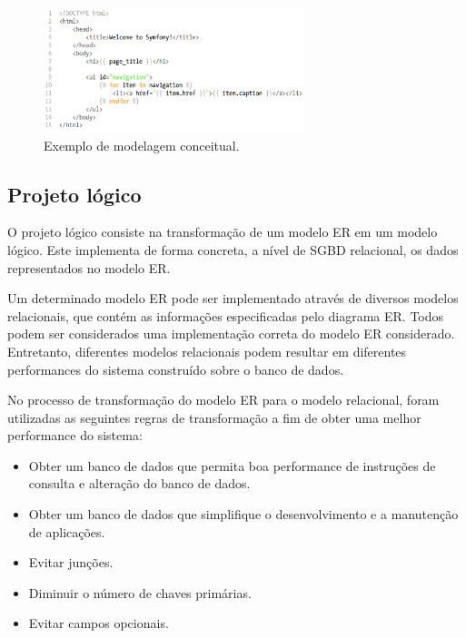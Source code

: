\documentclass[cic,tc]{iiufrgs}
\begin{document}
\begin{figure}[h]
    \caption{Exemplo de modelagem conceitual.}
       	\begin{center}
            \includegraphics[width=0.68\textwidth]{figuras/twig-symf.png}
        \end{center}
    \label{modelagemBDExemplol}
\end{figure}

\subsection{Projeto lógico}
\label{BDProjeto}

O projeto lógico consiste na transformação de um modelo ER em um modelo lógico. Este implementa de forma concreta, a nível de SGBD relacional, os dados representados no modelo ER.

Um determinado modelo ER pode ser implementado através de diversos modelos relacionais, que contém as informações especificadas pelo diagrama ER. Todos podem ser considerados uma implementação correta do modelo ER considerado. Entretanto, diferentes modelos relacionais podem resultar em diferentes performances do sistema construído sobre o banco de dados. 

No processo de transformação do modelo ER para o modelo relacional, foram utilizadas as seguintes regras de transformação \cite{heuser} a fim de obter uma melhor performance do sistema: 

\begin{itemize}
    \item Obter um banco de dados que permita boa performance de instruções de consulta e alteração do banco de dados.
    
    \item Obter um banco de dados que simplifique o desenvolvimento e a manutenção de aplicações.
    
    \item Evitar junções.
    
    \item Diminuir o número de chaves primárias.
    
    \item Evitar campos opcionais.
    
\end{itemize}
\end{document}

